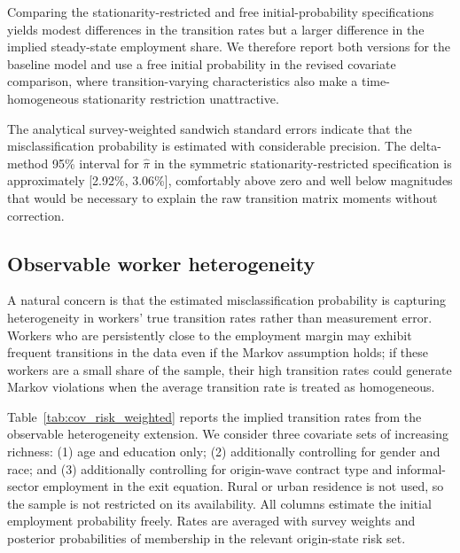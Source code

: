 Comparing the stationarity-restricted and free initial-probability specifications
yields modest differences in the transition rates but a larger difference in
the implied steady-state employment share. We therefore report both versions
for the baseline model and use a free initial probability in the revised
covariate comparison, where transition-varying characteristics also make a
time-homogeneous stationarity restriction unattractive.

The analytical survey-weighted sandwich standard errors indicate that the
misclassification probability is estimated with considerable precision. The
delta-method 95\% interval for $\hat{\pi}$ in the symmetric
stationarity-restricted specification is approximately [2.92\%, 3.06\%],
comfortably above zero and well below magnitudes that would
be necessary to explain the raw transition matrix moments without correction.

\subsection{Observable worker heterogeneity}\label{subsec:results:covariates}

A natural concern is that the estimated misclassification probability is
capturing heterogeneity in workers' true transition rates rather than
measurement error. Workers who are persistently close to the employment margin
may exhibit frequent transitions in the data even if the Markov assumption holds;
if these workers are a small share of the sample, their high transition rates
could generate Markov violations when the average transition rate is treated as
homogeneous.

Table~\ref{tab:cov_risk_weighted} reports the implied transition rates from the
observable heterogeneity extension. We consider three covariate sets of
increasing richness: (1) age and education only; (2) additionally controlling
for gender and race; and (3) additionally controlling for origin-wave contract
type and informal-sector employment in the exit equation. Rural or urban
residence is not used, so the sample is not restricted on its availability.
All columns estimate the initial employment probability freely. Rates are
averaged with survey weights and posterior probabilities of membership in the
relevant origin-state risk set.

